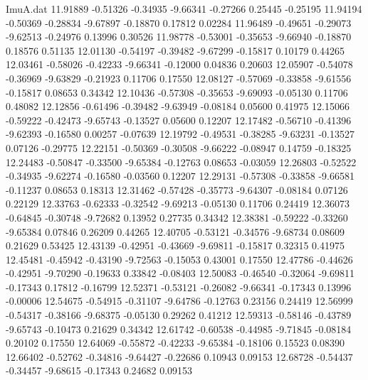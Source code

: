 \begin{filecontents}{ImuA.dat}
  11.91889   -0.51326   -0.34935   -9.66341   -0.27266    0.25445   -0.25195
  11.94194   -0.50369   -0.28834   -9.67897   -0.18870    0.17812    0.02284
  11.96489   -0.49651   -0.29073   -9.62513   -0.24976    0.13996    0.30526
  11.98778   -0.53001   -0.35653   -9.66940   -0.18870    0.18576    0.51135
  12.01130   -0.54197   -0.39482   -9.67299   -0.15817    0.10179    0.44265
  12.03461   -0.58026   -0.42233   -9.66341   -0.12000    0.04836    0.20603
  12.05907   -0.54078   -0.36969   -9.63829   -0.21923    0.11706    0.17550
  12.08127   -0.57069   -0.33858   -9.61556   -0.15817    0.08653    0.34342
  12.10436   -0.57308   -0.35653   -9.69093   -0.05130    0.11706    0.48082
  12.12856   -0.61496   -0.39482   -9.63949   -0.08184    0.05600    0.41975
  12.15066   -0.59222   -0.42473   -9.65743   -0.13527    0.05600    0.12207
  12.17482   -0.56710   -0.41396   -9.62393   -0.16580    0.00257   -0.07639
  12.19792   -0.49531   -0.38285   -9.63231   -0.13527    0.07126   -0.29775
  12.22151   -0.50369   -0.30508   -9.66222   -0.08947    0.14759   -0.18325
  12.24483   -0.50847   -0.33500   -9.65384   -0.12763    0.08653   -0.03059
  12.26803   -0.52522   -0.34935   -9.62274   -0.16580   -0.03560    0.12207
  12.29131   -0.57308   -0.33858   -9.66581   -0.11237    0.08653    0.18313
  12.31462   -0.57428   -0.35773   -9.64307   -0.08184    0.07126    0.22129
  12.33763   -0.62333   -0.32542   -9.69213   -0.05130    0.11706    0.24419
  12.36073   -0.64845   -0.30748   -9.72682    0.13952    0.27735    0.34342
  12.38381   -0.59222   -0.33260   -9.65384    0.07846    0.26209    0.44265
  12.40705   -0.53121   -0.34576   -9.68734    0.08609    0.21629    0.53425
  12.43139   -0.42951   -0.43669   -9.69811   -0.15817    0.32315    0.41975
  12.45481   -0.45942   -0.43190   -9.72563   -0.15053    0.43001    0.17550
  12.47786   -0.44626   -0.42951   -9.70290   -0.19633    0.33842   -0.08403
  12.50083   -0.46540   -0.32064   -9.69811   -0.17343    0.17812   -0.16799
  12.52371   -0.53121   -0.26082   -9.66341   -0.17343    0.13996   -0.00006
  12.54675   -0.54915   -0.31107   -9.64786   -0.12763    0.23156    0.24419
  12.56999   -0.54317   -0.38166   -9.68375   -0.05130    0.29262    0.41212
  12.59313   -0.58146   -0.43789   -9.65743   -0.10473    0.21629    0.34342
  12.61742   -0.60538   -0.44985   -9.71845   -0.08184    0.20102    0.17550
  12.64069   -0.55872   -0.42233   -9.65384   -0.18106    0.15523    0.08390
  12.66402   -0.52762   -0.34816   -9.64427   -0.22686    0.10943    0.09153
  12.68728   -0.54437   -0.34457   -9.68615   -0.17343    0.24682    0.09153

\end{filecontents}
